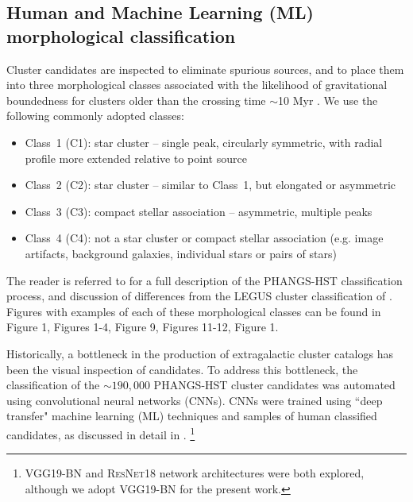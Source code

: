 \documentclass[]{aastex631}
\begin{document}
\subsection{Human and Machine Learning (ML) morphological classification}\label{ssec:classification}
Cluster candidates are inspected to eliminate spurious sources, and to place them into three morphological classes associated
with the likelihood of gravitational boundedness for clusters older than the crossing time $\sim$10 Myr \citep{whitmore_antennae_2010, gieles_distinction_2011, bastian_stellar_2012, fall_similarities_2012, chandar_star-cluster_2014, grasha_spatial_2015, adamo_legacy_2017, krumholz_star_2019, cook_star_2019, wei_deep_2020}.  We use the following commonly adopted classes:
\begin{itemize}
    \item Class~1 (C1): star cluster -- single peak, circularly symmetric, with radial profile more extended relative to point source
    \item Class~2 (C2): star cluster -- similar to Class~1, but elongated or asymmetric 
    \item Class~3 (C3): compact stellar association -- asymmetric, multiple peaks 
    \item Class~4 (C4): not a star cluster or compact stellar association (e.g. image artifacts, background galaxies, individual stars or pairs of stars) 
\end{itemize}
The reader is referred to \citet{whitmore_star_2021} for a full description of the PHANGS-HST classification process, and discussion of differences from the LEGUS cluster classification of \citet{adamo_legacy_2017}.  Figures with examples of each of these morphological classes can be found in \citet{wei_deep_2020} Figure 1, \citet{whitmore_star_2021} Figures 1-4, \citet{lee_phangs-hst_2022} Figure 9, \citet{deger_bright_2022} Figures 11-12, \citet{hannon_star_2023} Figure 1.

Historically, a bottleneck in the production of extragalactic cluster catalogs has been the visual inspection of candidates.
To address this bottleneck, the classification of the $\sim190,000$ PHANGS-HST cluster candidates was automated using convolutional neural networks (CNNs).  CNNs were trained using ``deep transfer" machine learning (ML) techniques and samples of human classified candidates, as discussed in detail in \cite{wei_deep_2020, whitmore_star_2021, hannon_star_2023}. \footnote{\textsc{VGG19-BN} \citep{simonyan_very_2015} and \textsc{ResNet18} \citep{he_deep_2015} network architectures were both explored, although we adopt \textsc{VGG19-BN} for the present work.}
\end{document}
